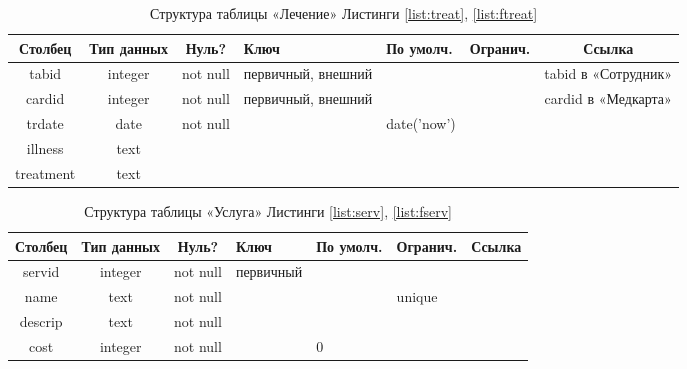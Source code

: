 \documentclass[14pt,a4paper,russian]{extreport}
\begin{document}
\begin{table}[h!]
    \centering
    \begin{tabularx}{\textwidth}{| c | c | c | X | X | X | c |}
        \hline
        \textbf{Столбец} & \textbf{Тип данных} & \textbf{Нуль?} & \textbf{Ключ} & \textbf{По
        умолч.} & \textbf{Огранич.} & \textbf{Ссылка} \\ \hline
        tabid & integer & not null & первичный, внешний & & & tabid в «Сотрудник» \\ \hline
        cardid & integer & not null & первичный, внешний & & & cardid в «Медкарта» \\ \hline
        trdate & date & not null & & date('now') & & \\ \hline 
        illness & text & & & & & \\ \hline
        treatment & text & & & & & \\ \hline
    \end{tabularx}
    \caption{Структура таблицы «Лечение» Листинги \ref{list:treat}, \ref{list:ftreat}}
    \label{table:treat}
\end{table}

\begin{table}[h!]
    \centering
    \begin{tabularx}{\textwidth}{| c | c | c | X | X | X | X |}
        \hline
        \textbf{Столбец} & \textbf{Тип данных} & \textbf{Нуль?} & \textbf{Ключ} & \textbf{По
        умолч.} & \textbf{Огранич.} & \textbf{Ссылка} \\ \hline
        servid & integer & not null & первичный & & & \\ \hline
        name & text & not null & & & unique & \\ \hline
        descrip & text & not null & & & & \\ \hline
        cost & integer & not null & & 0 & & \\ \hline
    \end{tabularx}
    \caption{Структура таблицы «Услуга» Листинги \ref{list:serv}, \ref{list:fserv}}
    \label{table:serv}
\end{table}
\end{document}
